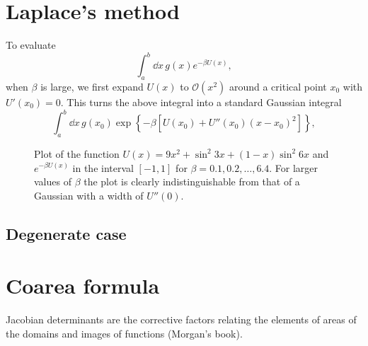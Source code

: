 \section{Laplace's method}

To evaluate
%
\begin{equation}
  \int_{a}^{b} \dd{x}\, g(x) e^{-\beta U(x)},
\end{equation}
when $\beta$ is large, we first expand $U(x)$ to $\mathcal{O}(x^{2})$ around a critical point $x_{0}$ with $U'(x_{0}) = 0$.
This turns the above integral into a standard Gaussian integral
%
\begin{equation}
  \int_{a}^{b} \dd{x}\, g(x_{0}) \exp\left\{-\beta\left[U(x_{0}) +  U''(x_{0})(x-x_{0})^{2}\right]\right\},
\end{equation}

\begin{figure}
  \caption{Plot of the function $U(x) = 9x^{2} + \sin^{2}{3x} + (1-x)\sin^{2}{6x}$ and $e^{-\beta U(x)}$ in the interval $[-1,1]$ for $\beta = 0.1, 0.2, \ldots, 6.4$.  For larger values of $\beta$ the plot is clearly indistinguishable from that of a Gaussian with a width of $U''(0)$.}
  \label{fig:}
\end{figure}

\subsection{Degenerate case}

\section{Coarea formula}

Jacobian determinants are the corrective factors relating the elements of areas of the domains and images of functions (Morgan's book).


